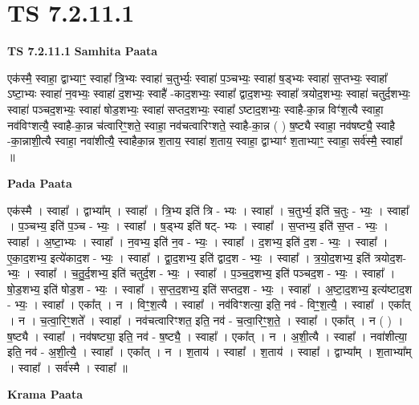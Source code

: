 \documentclass[17pt]{extarticle}
\begin{document}
\section{ TS 7.2.11.1 }

\textbf{TS 7.2.11.1 } \newline
\textbf{Samhita Paata} \newline

एक॑स्मै॒ स्वाहा॒ द्वाभ्याꣳ॒॒ स्वाहा᳚ त्रि॒भ्यः स्वाहा॑ च॒तुर्भ्यः॒ स्वाहा॑ प॒ञ्चभ्यः॒ स्वाहा॑ ष॒ड्भ्यः स्वाहा॑ स॒प्तभ्यः॒ स्वाहा᳚ ऽष्टा॒भ्यः स्वाहा॑ न॒वभ्यः॒ स्वाहा॑ द॒शभ्यः॒ स्वाहै॑ -काद॒शभ्यः॒ स्वाहा᳚ द्वाद॒शभ्यः॒ स्वाहा᳚ त्रयोद॒शभ्यः॒ स्वाहा॑ चतुर्द॒शभ्यः॒ स्वाहा॑ पञ्चद॒शभ्यः॒ स्वाहा॑ षोड॒शभ्यः॒ स्वाहा॑ सप्तद॒शभ्यः॒ स्वाहा᳚ ऽष्टाद॒शभ्यः॒ स्वाहै-का॒न्न विꣳ॑श॒त्यै स्वाहा॒ नव॑विꣳशत्यै॒ स्वाहै-का॒न्न च॑त्वारिꣳ॒॒शते॒ स्वाहा॒ नव॑चत्वारिꣳशते॒ स्वाहै-का॒न्न ( ) ष॒ष्ट्यै स्वाहा॒ नव॑षष्ट्यै॒ स्वाहै -का॒न्नाशी॒त्यै स्वाहा॒ नवा॑शीत्यै॒ स्वाहैका॒न्न श॒ताय॒ स्वाहा॑ श॒ताय॒ स्वाहा॒ द्वाभ्याꣳ॑ श॒ताभ्याꣳ॒॒ स्वाहा॒ सर्व॑स्मै॒ स्वाहा᳚ ॥ \newline

\textbf{Pada Paata} \newline

एक॑स्मै । स्वाहा᳚ । द्वाभ्या᳚म् । स्वाहा᳚ । त्रि॒भ्य इति॑ त्रि - भ्यः । स्वाहा᳚ । च॒तुर्भ्य॒ इति॑ च॒तुः - भ्यः॒ । स्वाहा᳚ । प॒ञ्चभ्य॒ इति॑ प॒ञ्च - भ्यः॒ । स्वाहा᳚ । ष॒ड्भ्य इति॑ षट्- भ्यः । स्वाहा᳚ । स॒प्तभ्य॒ इति॑ स॒प्त - भ्यः॒ । स्वाहा᳚ । अ॒ष्टा॒भ्यः । स्वाहा᳚ । न॒वभ्य॒ इति॑ न॒व - भ्यः॒ । स्वाहा᳚ । द॒शभ्य॒ इति॑ द॒श - भ्यः॒ । स्वाहा᳚ । ए॒का॒द॒शभ्य॒ इत्ये॑काद॒श - भ्यः॒ । स्वाहा᳚ । द्वा॒द॒शभ्य॒ इति॑ द्वाद॒श - भ्यः॒ । स्वाहा᳚ । त्र॒यो॒द॒शभ्य॒ इति॑ त्रयोद॒श-भ्यः॒ । स्वाहा᳚ । च॒तु॒र्द॒शभ्य॒ इति॑ चतुर्द॒श - भ्यः॒ । स्वाहा᳚ । प॒ञ्च॒द॒शभ्य॒ इति॑ पञ्चद॒श - भ्यः॒ । स्वाहा᳚ । षो॒ड॒शभ्य॒ इति॑ षोड॒श - भ्यः॒ । स्वाहा᳚ । स॒प्त॒द॒शभ्य॒ इति॑ सप्तद॒श - भ्यः॒ । स्वाहा᳚ । अ॒ष्टा॒द॒शभ्य॒ इत्य॑ष्टाद॒श - भ्यः॒ । स्वाहा᳚ । एका᳚त् । न । विꣳ॒॒श॒त्यै । स्वाहा᳚ । नव॑विꣳशत्या॒ इति॒ नव॑ - विꣳ॒॒श॒त्यै॒ । स्वाहा᳚ । एका᳚त् । न । च॒त्वा॒रिꣳ॒॒शते᳚ । स्वाहा᳚ । नव॑चत्वारिꣳशत॒ इति॒ नव॑ - च॒त्वा॒रिꣳ॒॒श॒ते॒ । स्वाहा᳚ । एका᳚त् । न ( ) । ष॒ष्ट्यै । स्वाहा᳚ । नव॑षष्ट्या॒ इति॒ नव॑ - ष॒ष्ट्यै॒ । स्वाहा᳚ । एका᳚त् । न । अ॒शी॒त्यै । स्वाहा᳚ । नवा॑शीत्या॒ इति॒ नव॑ - अ॒शी॒त्यै॒ । स्वाहा᳚ । एका᳚त् । न । श॒ताय॑ । स्वाहा᳚ । श॒ताय॑ । स्वाहा᳚ । द्वाभ्या᳚म् । श॒ताभ्या᳚म् । स्वाहा᳚ । सर्व॑स्मै । स्वाहा᳚ ॥  \newline


\textbf{Krama Paata} \newline
\end{document}
